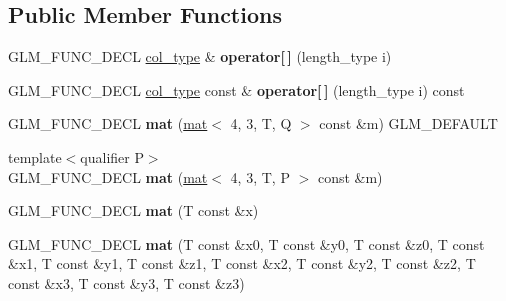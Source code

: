 \subsection*{Public Member Functions}
\begin{DoxyCompactItemize}
\item 
\mbox{\label{structglm_1_1mat_3_014_00_013_00_01T_00_01Q_01_4_a35ef287c1963b05945a5bb159ff3ac70}} 
G\+L\+M\+\_\+\+F\+U\+N\+C\+\_\+\+D\+E\+CL \hyperlink{structglm_1_1vec_3_013_00_01T_00_01Q_01_4}{col\+\_\+type} \& {\bfseries operator\mbox{[}$\,$\mbox{]}} (length\+\_\+type i)
\item 
\mbox{\label{structglm_1_1mat_3_014_00_013_00_01T_00_01Q_01_4_aaad4f07304cb7a1d857251e6cb39063a}} 
G\+L\+M\+\_\+\+F\+U\+N\+C\+\_\+\+D\+E\+CL \hyperlink{structglm_1_1vec_3_013_00_01T_00_01Q_01_4}{col\+\_\+type} const  \& {\bfseries operator\mbox{[}$\,$\mbox{]}} (length\+\_\+type i) const
\item 
\mbox{\label{structglm_1_1mat_3_014_00_013_00_01T_00_01Q_01_4_a9807920122eca0c2cba7fb00ac16eab0}} 
G\+L\+M\+\_\+\+F\+U\+N\+C\+\_\+\+D\+E\+CL {\bfseries mat} (\hyperlink{structglm_1_1mat}{mat}$<$ 4, 3, T, Q $>$ const \&m) G\+L\+M\+\_\+\+D\+E\+F\+A\+U\+LT
\item 
\mbox{\label{structglm_1_1mat_3_014_00_013_00_01T_00_01Q_01_4_a5fdcf64a44ef49290255b7cefd2263cb}} 
{\footnotesize template$<$qualifier P$>$ }\\G\+L\+M\+\_\+\+F\+U\+N\+C\+\_\+\+D\+E\+CL {\bfseries mat} (\hyperlink{structglm_1_1mat}{mat}$<$ 4, 3, T, P $>$ const \&m)
\item 
\mbox{\label{structglm_1_1mat_3_014_00_013_00_01T_00_01Q_01_4_abc9e90611ba4042185f287b977783379}} 
G\+L\+M\+\_\+\+F\+U\+N\+C\+\_\+\+D\+E\+CL {\bfseries mat} (T const \&x)
\item 
\mbox{\label{structglm_1_1mat_3_014_00_013_00_01T_00_01Q_01_4_a27d71fb5dea6afa4a12019832b035574}} 
G\+L\+M\+\_\+\+F\+U\+N\+C\+\_\+\+D\+E\+CL {\bfseries mat} (T const \&x0, T const \&y0, T const \&z0, T const \&x1, T const \&y1, T const \&z1, T const \&x2, T const \&y2, T const \&z2, T const \&x3, T const \&y3, T const \&z3)

\end{DoxyCompactItemize}
